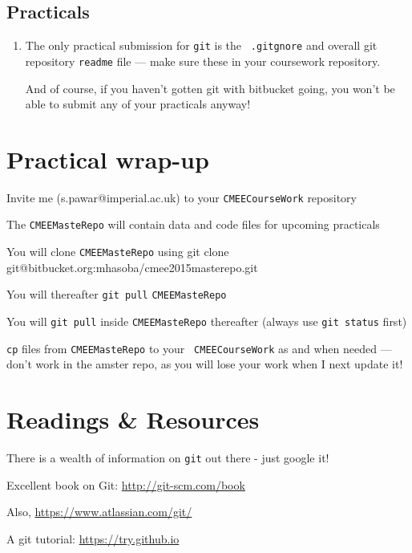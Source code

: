 \subsection[Practical]{Practicals}
  \begin{enumerate} \itemsep10pt
		\item The only practical submission for {\tt git} is the {\tt 
		.gitgnore} and overall git repository {\tt readme} file --- make 
		sure these in your coursework repository. 
		
		And of course, if you haven't gotten git with bitbucket 
		going, you won't be able to submit any of your practicals anyway!  
   
   \end{enumerate}


\section{Practical wrap-up}
   
  \begin{compactitem}

\item Invite me (s.pawar@imperial.ac.uk) to your {\tt CMEECourseWork} repository

\item The {\tt CMEEMasteRepo} will contain data and code files for 
upcoming practicals

\item You will clone {\tt CMEEMasteRepo} using {git clone 
git@bitbucket.org:mhasoba/cmee2015masterepo.git}

 \item You will thereafter {\tt git pull} {\tt CMEEMasteRepo}

\item You will {\tt git pull} inside {\tt CMEEMasteRepo} thereafter 
(always use {\tt git status} first)

\item {\tt cp} files from {\tt CMEEMasteRepo} to your {\tt 
CMEECourseWork} as and when needed --- don't work in the amster repo, 
as you will lose your work when I next update it! 

\end{compactitem}

\section{Readings \& Resources}

There is a wealth of information on {\tt git} out there - just google it!

\begin{compactitem}

\item Excellent book on Git: \url{http://git-scm.com/book}
\item Also, \url{https://www.atlassian.com/git/}
\item A git tutorial: \url{https://try.github.io}

\end{compactitem}
